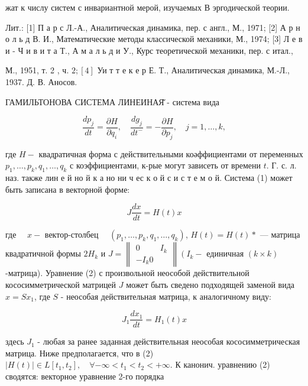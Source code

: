 \documentclass[10pt]{article}
\begin{document}
жат к числу систем с инвариантной мерой, изучаемых В эргодической теории.



Лит.: [1] П а р с Л.-А., Аналитическая динамика, пер. с англ., М., 1971; [2] А р н о л ь д В. И., Математические методы классической механики, М., 1974; [3] Л е в и - Ч и в и т а Т., А м а л ь д и У., Курс теоретической механики, пер. с итал.,

М., 1951, т. 2 , ч. $2 ;[4]$ Уи т т е к е р Е. Т., Аналитическая динамика, М.-Л., 1937. Д. В. Аносов.



ГАМИЛЬТОНОВА СИСТЕМА ЛИНЕИНАЯ̆ - система вида



\[

\frac{d p_{j}}{d t}=\frac{\partial H}{\partial q_{i}}, \quad \frac{d g_{j}}{d t^{-}}=-\frac{\partial H}{\partial p_{j}}, \quad j=1, \ldots, k,

\]



где $H-$ квадратичная форма с действительными коәффициентами от переменных $p_{1}, \ldots, p_{k}, q_{1}, \ldots, q_{k}$ с коэффициентами, к-рые могут зависеть от времени $t$. Г. с. л. наз. также лин е й но й к а но ни ч ес к о й с и с т е м о й. Система (1) может быть записана в векторной форме:



\[

J \frac{d x}{d t}=H(t) x

\]



где $\quad x-$ вектор-столбец $\quad\left(p_{1}, \ldots, p_{k}, q_{1}, \ldots, q_{k}\right)$, $H(t)=H(t) *$ — матрица квадратичной формы $2 H_{k}$ и $J=\left\|\begin{array}{rl}0 & I_{k} \\ -I_{k} 0\end{array}\right\|\left(I_{k}-\right.$ единичная $(k \times k)$-матрица). Уравнение (2) с произвольной неособой действительной кососимметрической матрицей $J$ может быть сведено подходящей заменой вида $x=S x_{1}$, где $S$ - неособая действительная матрица, к аналогичному виду:



\[

J_{1} \frac{d x_{1}}{d t}=H_{1}(t) x

\]



здесь $J_{1}$ - любая за ранее заданная действительная неособая кососимметрическая матрица. Ниже предполагается, что в (2) $|H(t)| \in L\left[t_{1}, t_{2}\right], \quad \forall-\infty<t_{1}<t_{2}<+\infty$. К канонич. уравнению (2) сводятся: векторное уравнение 2-го порядка
\end{document}
